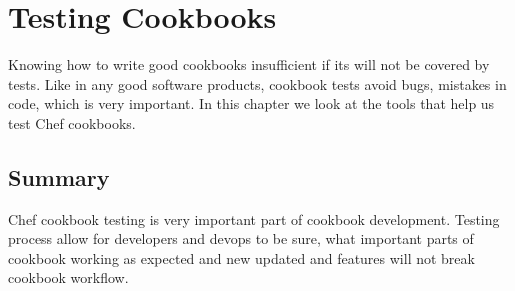 \chapter{Testing Cookbooks}

Knowing how to write good cookbooks insufficient if its will not be covered by tests. Like in any good software products, cookbook tests avoid bugs, mistakes in code, which is very important. In this chapter we look at the tools that help us test Chef cookbooks.










\section{Summary}

Chef cookbook testing is very important part of cookbook development. Testing process allow for developers and devops to be sure, what important parts of cookbook working as expected and new updated and features will not break cookbook workflow.